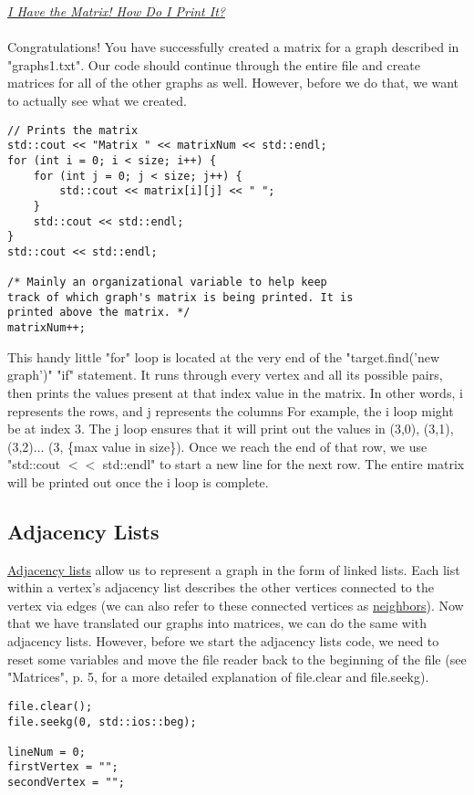 \documentclass{article}
\begin{document}
\underline{\textit{I Have the Matrix! How Do I Print It?}} \\ \\
Congratulations! You have successfully created a matrix for a graph described in "graphs1.txt". Our code should continue through the entire file and create matrices for all of the other graphs as well. However, before we do that, we want to actually see what we created.

\begin{lstlisting}
// Prints the matrix
std::cout << "Matrix " << matrixNum << std::endl;
for (int i = 0; i < size; i++) {
    for (int j = 0; j < size; j++) {
        std::cout << matrix[i][j] << " ";
    }
    std::cout << std::endl;
}
std::cout << std::endl;

/* Mainly an organizational variable to help keep 
track of which graph's matrix is being printed. It is 
printed above the matrix. */
matrixNum++;
\end{lstlisting}
This handy little "for" loop is located at the very end of the "target.find('new graph')" "if" statement. It runs through every vertex and all its possible pairs, then prints the values present at that index value in the matrix. In other words, i represents the rows, and j represents the columns For example, the i loop might be at index 3. The j loop ensures that it will print out the values in (3,0), (3,1), (3,2)... (3, \{max value in size\}). Once we reach the end of that row, we use "std::cout $<<$ std::endl" to start a new line for the next row. The entire matrix will be printed out once the i loop is complete.

\pagebreak

\subsection{Adjacency Lists}
\underline{Adjacency lists} allow us to represent a graph in the form of linked lists. Each list within a vertex's adjacency list describes the other vertices connected to the vertex via edges (we can also refer to these connected vertices as \underline{neighbors}). Now that we have translated our graphs into matrices, we can do the same with adjacency lists. However, before we start the adjacency lists code, we need to reset some variables and move the file reader back to the beginning of the file (see "Matrices", p. 5, for a more detailed explanation of file.clear and file.seekg). \\

\begin{lstlisting}
file.clear();
file.seekg(0, std::ios::beg);

lineNum = 0;
firstVertex = "";
secondVertex = "";
\end{lstlisting}
\end{document}
